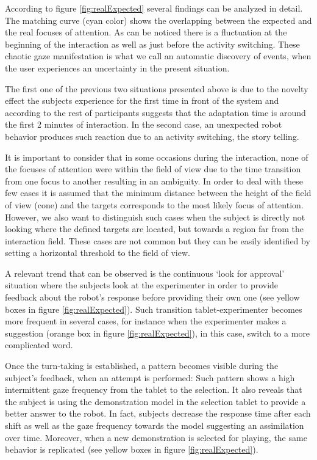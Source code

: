 \documentclass{sig-alternate}
\begin{document}
According to figure \ref{fig:realExpected} several findings can be analyzed in detail. The matching curve (cyan color) shows the overlapping between the expected and the real focuses of attention. As can be noticed there is a fluctuation at the beginning of the interaction as well as just before the activity switching. These chaotic gaze manifestation is what we call an automatic discovery of events, when the user experiences an uncertainty in the present situation. 

The first one of the previous two situations presented above is due to the novelty effect the subjects experience for the first time in front of the system and according to the rest of participants suggests that the adaptation time is around the first 2 minutes of interaction. In the second case, an unexpected robot behavior produces such reaction due to an activity switching, the story telling.

It is important to consider that in some occasions during the interaction, none of the focuses of attention were within the field of view due to the time transition from one focus to another resulting in an ambiguity. In order to deal with these few cases it is assumed that the minimum distance between the height of the field of view (cone) and the targets corresponds to the most likely focus of attention. However, we also want to distinguish such cases when the subject is directly not looking where the defined targets are located, but towards a region far from the interaction field. These cases are not common but they can be easily identified by setting a horizontal threshold to the field of view.

A relevant trend that can be observed is the continuous `look for approval' situation where the subjects look at the experimenter in order to provide feedback about the robot's response before providing their own one (see yellow boxes in figure \ref{fig:realExpected}). Such transition tablet-experimenter becomes more frequent in several cases, for instance when the experimenter makes a suggestion (orange box in figure \ref{fig:realExpected}), in this case, switch to a more complicated word.

Once the turn-taking is established, a pattern becomes visible during the subject's feedback, when an attempt is performed: Such pattern shows a high intermittent gaze frequency from the tablet to the selection. It also reveals that the subject is using the demonstration model in the selection tablet to provide a better answer to the robot. In fact, subjects decrease the response time after each shift as well as the gaze frequency towards the model suggesting an assimilation over time. Moreover, when a new demonstration is selected for playing, the same behavior is replicated (see yellow boxes in figure \ref{fig:realExpected}).
\end{document}
